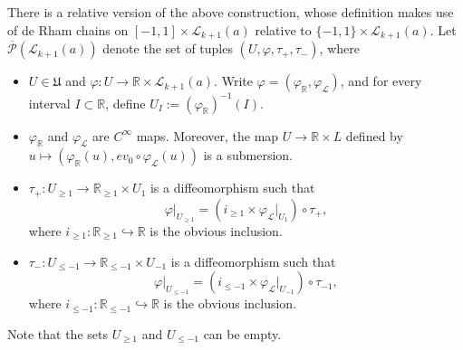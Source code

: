 \documentclass[a4paper]{article}
\numberwithin{equation}{section}
\begin{document}
There is a relative version of the above construction, whose definition makes use of de Rham chains on $[-1,1]\times\mathcal{L}_{k+1}(a)$ relative to $\{-1,1\}\times\mathcal{L}_{k+1}(a)$. Let $\overline{\mathcal{P}}(\mathcal{L}_{k+1}(a))$ denote the set of tuples $(U,\varphi,\tau_+,\tau_-)$, where
\begin{itemize}
	\item $U\in\mathfrak{U}$ and $\varphi:U\rightarrow\mathbb{R}\times\mathcal{L}_{k+1}(a)$. Write $\varphi=(\varphi_\mathbb{R},\varphi_\mathcal{L})$, and for every interval $I\subset\mathbb{R}$, define $U_I:=(\varphi_\mathbb{R})^{-1}(I)$.
	\item $\varphi_\mathbb{R}$ and $\varphi_\mathcal{L}$ are $C^\infty$ maps. Moreover, the map $U\rightarrow\mathbb{R}\times L$ defined by $u\mapsto\left(\varphi_\mathbb{R}(u),\mathit{ev}_0\circ\varphi_\mathcal{L}(u)\right)$ is a submersion.
	\item $\tau_+:U_{\geq1}\rightarrow\mathbb{R}_{\geq1}\times U_1$ is a diffeomorphism such that
	\begin{equation}
	\varphi|_{U_{\geq1}}=(i_{\geq1}\times\varphi_\mathcal{L}|_{U_1})\circ\tau_+,
	\end{equation}
	where $i_{\geq1}:\mathbb{R}_{\geq1}\hookrightarrow\mathbb{R}$ is the obvious inclusion.
	\item $\tau_-:U_{\leq-1}\rightarrow\mathbb{R}_{\leq-1}\times U_{-1}$ is a diffeomorphism such that
	\begin{equation}
	\varphi|_{U_{\leq-1}}=(i_{\leq-1}\times\varphi_\mathcal{L}|_{U_{-1}})\circ\tau_{-1},
	\end{equation}
	where $i_{\leq-1}:\mathbb{R}_{\leq-1}\hookrightarrow\mathbb{R}$ is the obvious inclusion.
\end{itemize}
Note that the sets $U_{\geq1}$ and $U_{\leq-1}$ can be empty.
\end{document}
